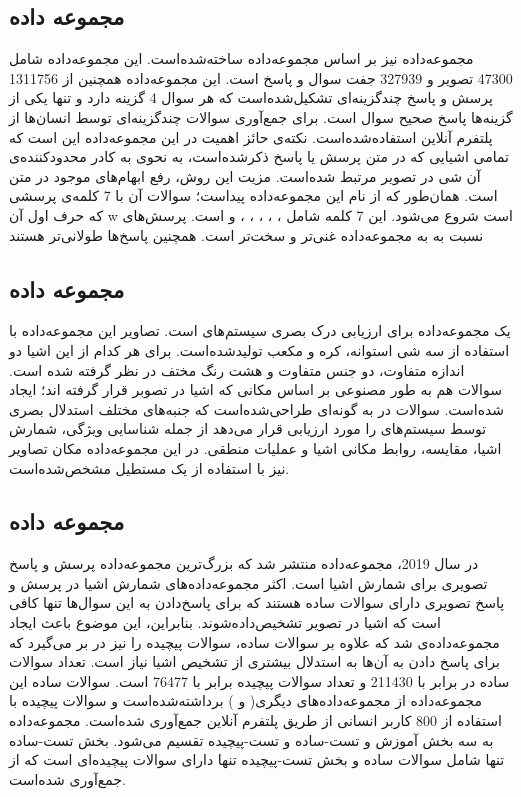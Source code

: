 \subsection{مجموعه داده }
{
	مجموعه‌داده
	نیز بر اساس مجموعه‌داده
	  ساخته‌شده‌است. این مجموعه‌داده شامل 47300 تصویر و 327939 جفت سوال و پاسخ است. این مجموعه‌داده همچنین از 1311756 پرسش و پاسخ چند‌گزینه‌ای تشکیل‌شده‌است که هر سوال 4 گزینه دارد و تنها یکی از گزینه‌ها پاسخ صحیح سوال است. برای جمع‌آوری سوالات چندگزینه‌ای توسط انسان‌ها از پلتفرم آنلاین 
  استفاده‌شده‌است. نکته‌ی حائز اهمیت در این ‌مجموعه‌داده این است که تمامی اشیایی که در متن پرسش یا پاسخ ذکر‌شده‌است، به نحوی به کادر محدود‌کننده‌ی آن شی در تصویر مرتبط شده‌است. مزیت این روش، رفع ابهام‌های موجود در متن است.  همان‌طور که از نام این مجموعه‌داده پیداست؛ سوالات آن با 7 کلمه‌ی پرسشی که حرف اول آن w است شروع می‌شود. این 7 کلمه شامل
  ،
  ،
  ،
  ،
  ،
  و
	است. پرسش‌های
	 نسبت به به مجموعه‌داده 
  غنی‌تر و سخت‌تر است. همچنین پاسخ‌ها طولانی‌تر هستند
}
\subsection{مجموعه داده }
{
 یک مجموعه‌داده برای ارزیابی درک بصری سیستم‌های 
  است. تصاویر این مجموعه‌داده با استفاده از سه شی استوانه، کره و مکعب تولیدشده‌است. برای هر کدام از این اشیا دو اندازه متفاوت، دو جنس متفاوت و هشت رنگ مختف در نظر گرفته شده است. سوالات هم به طور مصنوعی بر اساس مکانی که اشیا در تصوبر قرار گرفته اند؛ ایجاد شده‌است. سوالات در
   به گونه‌ای طراحی‌شده‌است که جنبه‌های مختلف استدلال بصری توسط سیستم‌های 
   را مورد ارزیابی قرار می‌دهد از جمله شناسایی ویژگی، شمارش اشیا، مقایسه، روابط مکانی اشیا و عملیات منطقی. در این مجموعه‌داده مکان تصاویر نیز با استفاده از یک مستطیل مشخص‌شده‌است.
}
\subsection{مجموعه داده }
{
	در سال 2019، مجموعه‌داده 
منتشر شد که بزرگ‌ترین مجموعه‌داده پرسش و پاسخ تصویری برای شمارش اشیا است. اکثر مجموعه‌داده‌های شمارش اشیا در پرسش و پاسخ تصویری دارای سوالات ساده هستند که برای پاسخ‌دادن به این سوال‌‌ها تنها کافی است که اشیا در تصویر تشخیص‌داده‌شوند. بنابراین، این موضوع باعث ایجاد مجموعه‌داده‌ی 
  شد که علاوه بر سوالات ساده، سوالات پیچیده را نیز در بر می‌گیرد که برای پاسخ دادن به آن‌ها به استدلال بیشتری از تشخیص اشیا نیاز است. تعداد سوالات ساده در
  برابر با 211430 و تعداد سوالات پیچیده برابر با 76477 است. سوالات ساده این مجموعه‌داده از مجموعه‌داده‌های دیگری( 
  و 
  ) برداشته‌شده‌است و سوالات پیچیده با استفاده از 800 کاربر انسانی از طریق پلتفرم آنلاین 
  جمع‌آوری شده‌است. مجموعه‌داده 
  به سه بخش آموزش و تست-ساده و تست-پیچیده تقسیم می‌شود. بخش تست-ساده تنها شامل سوالات ساده و بخش تست-پیچیده تنها دارای سوالات پیچیده‌ای است که از 
  جمع‌آوری شده‌است. 

 }
